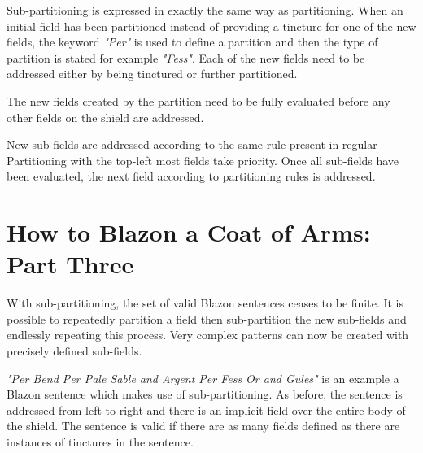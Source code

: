 Sub-partitioning is expressed in exactly the same way as partitioning. When an  initial field has been partitioned instead of providing a tincture for one of the new fields, the keyword \emph{"Per"} is used to define a partition and then the type of partition is stated for example \emph{"Fess"}.  Each of the new fields need to be addressed either by being tinctured or further partitioned. 

The new fields created by the partition need to be fully evaluated before any other fields on the shield are addressed.  

New sub-fields are addressed according to the same rule present in regular Partitioning with the top-left most fields take priority.  Once all sub-fields have been evaluated, the next field according to partitioning rules is addressed.

\section{How to Blazon a Coat of Arms: Part Three}

With sub-partitioning, the set of valid Blazon sentences ceases to be finite.  It is possible to repeatedly partition a field then sub-partition the new sub-fields and endlessly repeating this process.  Very complex patterns can now be created with precisely defined sub-fields.

\emph{"Per Bend Per Pale Sable and Argent Per Fess Or and Gules"} is an example a Blazon sentence which makes use of sub-partitioning.  As before,  the sentence is addressed from left to right and there is an implicit field over the entire body of the shield.  The sentence is valid if there are as many fields defined as there are instances of tinctures in the sentence. 


